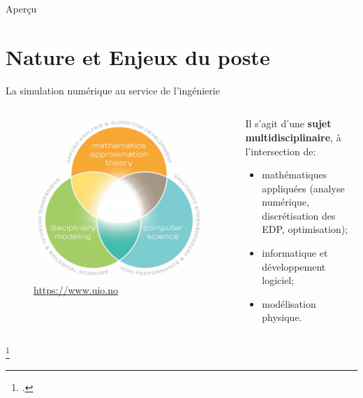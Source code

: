 \documentclass[aspectratio=169, french]{beamer}
\begin{document}
	
	
\begin{frame}[plain]
	
	
	
\end{frame}

	
	
\begin{frame}{Aperçu}
		
		\tableofcontents
		
\end{frame}

	
\section{Nature et Enjeux du poste}

\begin{frame}{La simulation numérique au service de l'ingénierie}
	
	\begin{columns}
		\begin{column}{.45\textwidth}
		\begin{figure}
			\includegraphics[width=.9\textwidth]{cse.jpg}
			\caption{\href{https://www.uio.no/english/studies/programmes/computational-science-master/why-choose/}{https://www.uio.no}}
		\end{figure}	
		\end{column}
		\begin{column}{.5\textwidth}
		Il s'agit d'une \textbf{sujet multidisciplinaire}, à l'intersection de\footnotemark :
		\begin{itemize}
			\item mathématiques appliquées (analyse numérique, discrétisation des EDP, optimisation);
			\item informatique et développement logiciel;
			\item modélisation physique.
		\end{itemize}
		
		\end{column}
	\end{columns}	
	\footcitetext{ulrich2018cse}
\end{frame}
\end{document}
